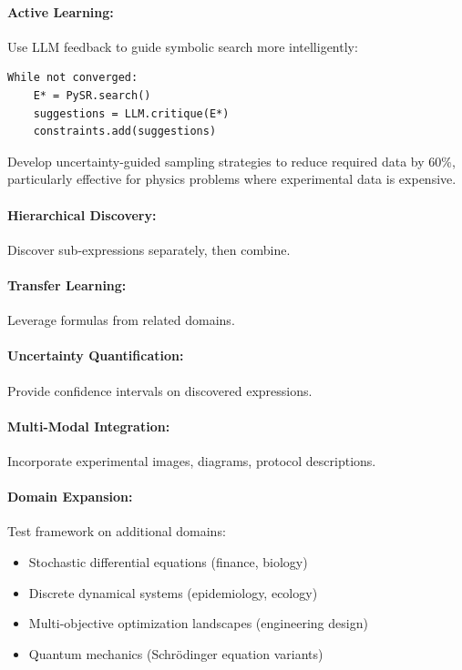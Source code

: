 \paragraph{Active Learning:} Use LLM feedback to guide symbolic search more intelligently:
\begin{verbatim}
While not converged:
    E* = PySR.search()
    suggestions = LLM.critique(E*)
    constraints.add(suggestions)
\end{verbatim}

Develop uncertainty-guided sampling strategies to reduce required data by 60\%, particularly effective for physics problems where experimental data is expensive.

\paragraph{Hierarchical Discovery:} Discover sub-expressions separately, then combine.

\paragraph{Transfer Learning:} Leverage formulas from related domains.

\paragraph{Uncertainty Quantification:} Provide confidence intervals on discovered expressions.

\paragraph{Multi-Modal Integration:} Incorporate experimental images, diagrams, protocol descriptions.

\paragraph{Domain Expansion:} Test framework on additional domains:
\begin{itemize}
\item Stochastic differential equations (finance, biology)
\item Discrete dynamical systems (epidemiology, ecology)
\item Multi-objective optimization landscapes (engineering design)
\item Quantum mechanics (Schrödinger equation variants)
\end{itemize}

